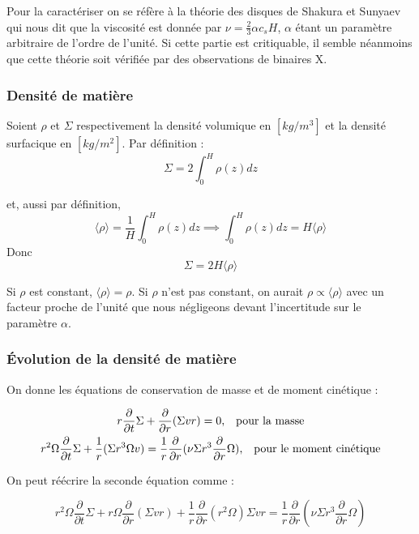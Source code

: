 \documentclass[a4paper,12pt]{article}
\newcommand{\derivt}[1]{\frac{\partial}{\partial t} #1}
\newcommand{\derivr}[1]{\frac{\partial}{\partial r} #1}
\begin{document}
Pour la caractériser on se réfère à la théorie des disques de Shakura et Sunyaev qui nous dit que la viscosité est donnée par $\nu=\frac{2}{3}\alpha c_s H$, $\alpha $ étant un paramètre arbitraire de l'ordre de l'unité. Si cette partie est critiquable, il semble néanmoins que cette théorie soit vérifiée par des observations de binaires X. 

\subsubsection{Densité de matière}

Soient $\rho$ et $\Sigma$ respectivement la densité volumique en $[kg/m^3]$ et la densité surfacique en $[kg/m^2]$. Par définition :
\begin{equation*}
    \Sigma = 2 \int_{0}^{H}\rho (z) dz
\end{equation*}

\noindent et, aussi par définition, 
\begin{equation*}
    \langle \rho \rangle = \frac{1}{H} \int_0^H \rho (z) dz \implies \int_0^H \rho (z) dz = H \langle \rho \rangle
\end{equation*}
Donc
\begin{equation*}
     \Sigma = 2 H  \langle \rho \rangle
\end{equation*}

Si $\rho$ est constant, $ \langle \rho \rangle = \rho$. Si $\rho$ n'est pas constant, on aurait $\rho \propto  \langle \rho \rangle$ avec un facteur proche de l'unité que nous négligeons devant l'incertitude sur le paramètre $\alpha$.

\subsubsection{Évolution de la densité de matière}

On donne les équations de conservation de masse et de moment cinétique :


\begin{gather*}
    r\derivt{\Sigma} +\derivr{(\Sigma vr)} =0 \text{,\quad  pour la masse}\\
    r^2\Omega \derivt{\Sigma} + \frac{1}{r} (\Sigma r^3 \Omega v) =\frac{1}{r}\derivr{(\nu \Sigma r^3 \derivr\Omega)} \text{,\quad pour le moment cinétique}
\end{gather*}

\noindent On peut réécrire la seconde équation comme :

\begin{equation*}
    r^2\Omega \derivt {\Sigma} + r\Omega \derivr{(\Sigma vr)} + \frac{1}{r}\derivr{(r^2\Omega)} \Sigma vr=\frac{1}{r}\derivr{(\nu \Sigma r^3 \derivr\Omega)}
\end{equation*}
\end{document}
